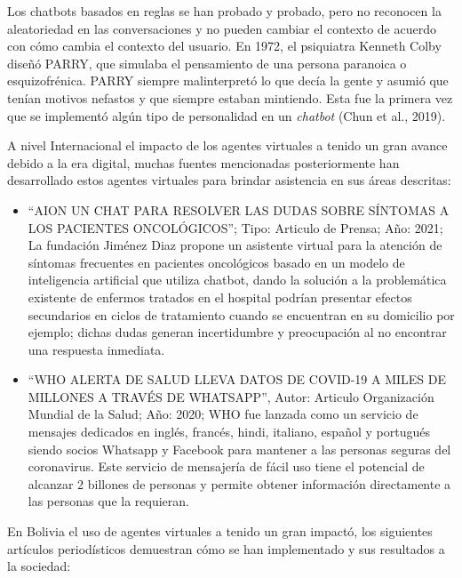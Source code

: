 \documentclass[letter, openright, 12pt]{book}
\begin{document}
Los chatbots basados en reglas se han probado y probado, pero no reconocen la aleatoriedad en las conversaciones y no pueden cambiar el contexto de acuerdo con cómo cambia el contexto del usuario. En 1972, el psiquiatra Kenneth Colby diseñó PARRY, que simulaba el pensamiento de una persona paranoica o esquizofrénica. PARRY siempre malinterpretó lo que decía la gente y asumió que tenían motivos nefastos y que siempre estaban mintiendo. Esta fue la primera vez que se implementó algún tipo de personalidad en un \textit{chatbot} (Chun et al., 2019).\par
A nivel Internacional el impacto de los agentes virtuales a tenido un gran avance debido a la era digital, muchas fuentes mencionadas posteriormente han desarrollado estos agentes virtuales para brindar asistencia en sus áreas descritas:

\begin{itemize}
\item “AION UN CHAT PARA RESOLVER LAS DUDAS SOBRE SÍNTOMAS A LOS PACIENTES ONCOLÓGICOS”; Tipo: Articulo de Prensa; Año: 2021; La fundación Jiménez Diaz propone un asistente virtual para la atención de síntomas frecuentes en pacientes oncológicos basado en un modelo de inteligencia artificial que utiliza chatbot, dando la solución a la problemática existente de enfermos tratados en el hospital podrían presentar efectos secundarios en ciclos de tratamiento cuando se encuentran en su domicilio por ejemplo; dichas dudas generan incertidumbre y preocupación al no encontrar una respuesta inmediata.

\item “WHO ALERTA DE SALUD LLEVA DATOS DE COVID-19 A MILES DE MILLONES A TRAVÉS DE WHATSAPP”, Autor: Articulo Organización Mundial de la Salud; Año: 2020; WHO fue lanzada como un servicio de mensajes dedicados en inglés, francés, hindi, italiano, español y portugués siendo socios Whatsapp y Facebook para mantener a las personas seguras del coronavirus. Este servicio de mensajería de fácil uso tiene el potencial de alcanzar 2 billones de personas y permite obtener información directamente a las personas que la requieran.
\end{itemize}

En Bolivia el uso de agentes virtuales a tenido un gran impactó, los siguientes artículos periodísticos demuestran cómo se han implementado y sus resultados a la sociedad:
\end{document}
